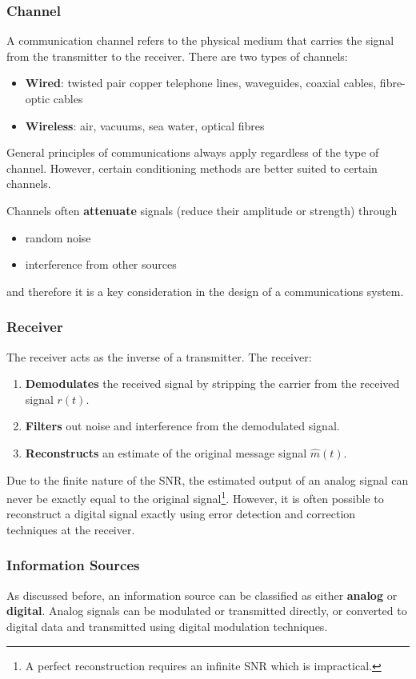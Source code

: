 \documentclass{article}
\begin{document}
\subsubsection{Channel}
A communication channel refers to the physical medium that carries the signal from the transmitter to the receiver.
There are two types of channels:
\begin{itemize}
    \item \textbf{Wired}: twisted pair copper telephone lines, waveguides, coaxial cables, fibre-optic cables
    \item \textbf{Wireless}: air, vacuums, sea water, optical fibres
\end{itemize}
General principles of communications always apply regardless of the type of channel. However, certain
conditioning methods are better suited to certain channels.

Channels often \textbf{attenuate} signals (reduce their amplitude or strength) through
\begin{itemize}
    \item random noise
    \item interference from other sources
\end{itemize}
and therefore it is a key consideration in the design of a communications system.
\subsubsection{Receiver}
The receiver acts as the inverse of a transmitter. The receiver:
\begin{enumerate}
    \item \textbf{Demodulates} the received signal by stripping the carrier from the received signal \(r\left( t \right)\).
    \item \textbf{Filters} out noise and interference from the demodulated signal.
    \item \textbf{Reconstructs} an estimate of the original message signal \(\hat{m}\left( t \right)\).
\end{enumerate}
Due to the finite nature of the SNR, the estimated output of an analog signal can never be exactly
equal to the original signal\footnote{A perfect reconstruction requires an infinite SNR which is impractical.}.
However, it is often possible to reconstruct a digital signal exactly
using error detection and correction techniques at the receiver.
\subsubsection{Information Sources}
As discussed before, an information source can be classified as either \textbf{analog} or \textbf{digital}.
Analog signals can be modulated or transmitted directly, or
converted to digital data and transmitted using digital modulation techniques.
\end{document}
